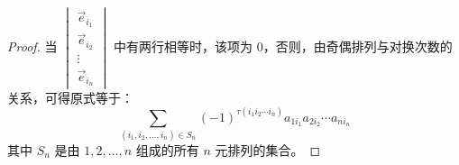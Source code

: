 \begin{proof}
	当 $\begin{vmatrix} \vec e_{i_1} \\ \vec e_{i_2} \\ \vdots \\ \vec e_{i_n} \end{vmatrix}$ 中有两行相等时，该项为 $0$，否则，由奇偶排列与对换次数的关系，可得原式等于：
	$$
	\sum\limits_{(i_1, i_2, \ldots, i_n) \in S_n} (-1)^{\tau(i_1 i_2 \cdots i_n)} a_{1 i_1} a_{2 i_2} \cdots a_{n i_n}
	$$
	其中 $S_n$ 是由 $1, 2, \ldots, n$ 组成的所有 $n$ 元排列的集合。
\end{proof}